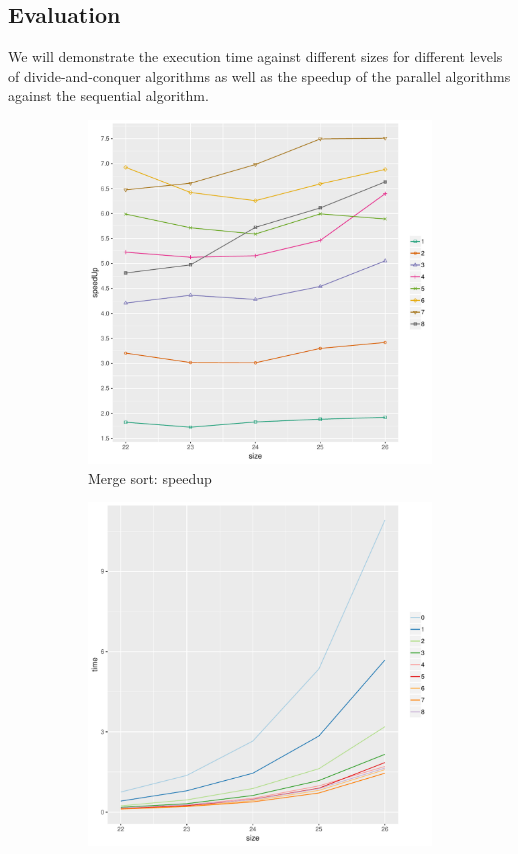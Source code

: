 \subsection{Evaluation}
We will demonstrate the execution time against different sizes for different levels of divide-and-conquer algorithms as well as the speedup of the parallel algorithms against the sequential algorithm.
\begin{figure}[ht]
    \begin{subfigure}[b]{0.475\textwidth}
        \centering
        \includegraphics[width=\textwidth]{eval/mergesort-speedup.pdf}
        \caption{Merge sort: speedup}
        \label{eval:fig:ms:speed}
    \end{subfigure}
    \hfill
    \begin{subfigure}[b]{0.475\textwidth}
        \centering
        \includegraphics[width=\textwidth]{eval/mergesort-time.pdf}

\end{subfigure}
\end{figure}
